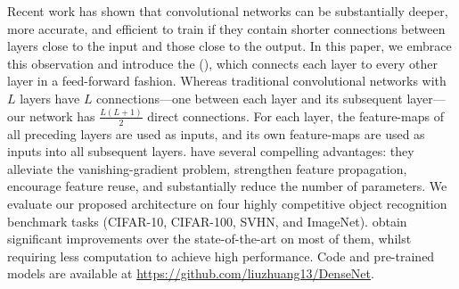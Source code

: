 Recent work has shown that convolutional networks can be substantially deeper, more accurate, and efficient to train if they contain shorter connections between layers close to the input and those close to the output.
In this paper, we embrace this observation and introduce the \methodnamecap{} (\methodnameshort{}), which connects each layer to every other layer in a feed-forward fashion. Whereas traditional convolutional networks with $L$ layers have $L$ connections---one between each layer and its subsequent layer---our network has $\frac{L(L+1)}{2}$ direct connections.
For each layer, the feature-maps of all preceding layers are used as inputs, and its own feature-maps are used as inputs into all subsequent layers.
\methodnameshorts{} have several compelling advantages:
they alleviate the vanishing-gradient problem, strengthen feature propagation, encourage feature reuse, and substantially reduce the number of parameters.
We evaluate our proposed architecture on four highly competitive object recognition benchmark tasks (CIFAR-10, CIFAR-100, SVHN, and ImageNet). \methodnameshorts{} obtain significant improvements over the state-of-the-art on most of them, whilst requiring less computation to achieve high performance. Code and pre-trained models are available at \url{https://github.com/liuzhuang13/DenseNet}.






